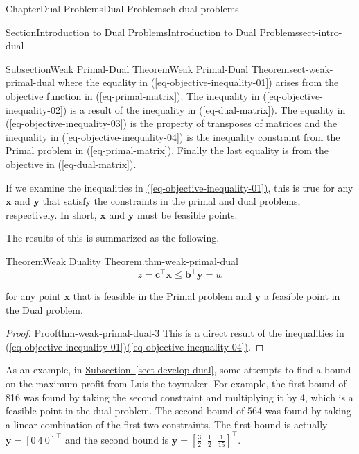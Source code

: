 \documentclass[oneside,10pt,]{book}
\newcommand{\xreffont}{\relax}
\numberwithin{equation}{section}
\begin{document}
\begin{chapterptx}{Chapter}{Dual Problems}{}{Dual Problems}{}{}{ch-dual-problems}
\begin{sectionptx}{Section}{Introduction to Dual Problems}{}{Introduction to Dual Problems}{}{}{sect-intro-dual}
\begin{subsectionptx}{Subsection}{Weak Primal-Dual Theorem}{}{Weak Primal-Dual Theorem}{}{}{sect-weak-primal-dual}
where the equality in \hyperref[eq-objective-inequality-01]{({\xreffont\ref{eq-objective-inequality-01}})} arises from the objective function in \hyperref[eq-primal-matrix]{({\xreffont\ref{eq-primal-matrix}})}.  The inequality in \hyperref[eq-objective-inequality-02]{({\xreffont\ref{eq-objective-inequality-02}})} is a result of the inequality in \hyperref[eq-dual-matrix]{({\xreffont\ref{eq-dual-matrix}})}. The equality in \hyperref[eq-objective-inequality-03]{({\xreffont\ref{eq-objective-inequality-03}})} is the property of transposes of matrices and the inequality in \hyperref[eq-objective-inequality-04]{({\xreffont\ref{eq-objective-inequality-04}})} is the inequality constraint from the Primal problem in \hyperref[eq-primal-matrix]{({\xreffont\ref{eq-primal-matrix}})}.  Finally the last equality is from the objective in \hyperref[eq-dual-matrix]{({\xreffont\ref{eq-dual-matrix}})}.%
\par
If we examine the inequalities in \hyperref[eq-objective-inequality-01]{({\xreffont\ref{eq-objective-inequality-01}})}, this is true for any \(\boldsymbol{x}\) and \(\boldsymbol{y}\) that satisfy the constraints in the primal and dual problems, respectively. In short, \(\boldsymbol{x}\) and \(\boldsymbol{y}\) must be feasible points.%
\par
The results of this is summarized as the following.%
\begin{theorem}{Theorem}{Weak Duality Theorem.}{}{thm-weak-primal-dual}%
%
\begin{equation*}
z = \boldsymbol{c}^{\intercal} \boldsymbol{x} \leq \boldsymbol{b}^{\intercal} \boldsymbol{y} = w
\end{equation*}
%
\par
for any point \(\boldsymbol{x}\) that is feasible in the Primal problem  and \(\boldsymbol{y}\) a feasible point in the Dual problem.%
\end{theorem}
\begin{proof}{Proof}{}{thm-weak-primal-dual-3}
This is a direct result of the inequalities in \hyperref[eq-objective-inequality-01]{({\xreffont\ref{eq-objective-inequality-01}})}\textendash{}\hyperref[eq-objective-inequality-04]{({\xreffont\ref{eq-objective-inequality-04}})}.%
\end{proof}
As an example, in \hyperref[sect-develop-dual]{Subsection~{\xreffont\ref{sect-develop-dual}}}, some attempts to find a bound on the maximum profit from Luis the toymaker. For example, the first bound of \textdollar{}816 was found by taking the second constraint and multiplying it by 4, which is a feasible point in the dual problem. The second bound of \textdollar{}564 was found by taking a linear combination of the first two constraints. The first bound is actually \(\boldsymbol{y} = [0~4~0]^{\intercal}\) and the second bound is \(\boldsymbol{y} = [\frac{3}{2}\;\;\frac{1}{2}\;\;\frac{1}{15}]^{\intercal}\).%

\end{subsectionptx}
\end{sectionptx}
\end{chapterptx}
\end{document}
